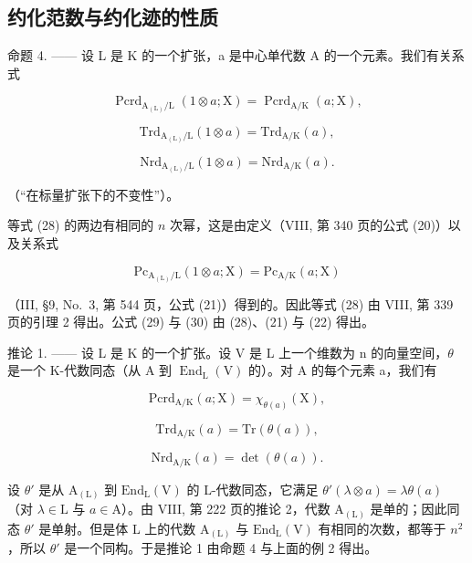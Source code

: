 \subsection{约化范数与约化迹的性质}

命题 4. —— 设 L 是 K 的一个扩张，a 是中心单代数 A 的一个元素。我们有关系式

\[
\operatorname{Pcrd} _ {\mathrm{A} _ {(\mathrm{L})} / \mathrm{L}} (1 \otimes a; \mathrm{X}) = \operatorname{Pcrd} _ {\mathrm{A} / \mathrm{K}} (a; \mathrm{X}),\tag{28}
\]

\[
\mathrm{Trd} _ {\mathrm{A} _ {(\mathrm{L})} / \mathrm{L}} (1 \otimes a) = \mathrm{Trd} _ {\mathrm{A} / \mathrm{K}} (a),\tag{29}
\]

\[
\mathrm{Nrd} _ {\mathrm{A} _ {(\mathrm{L})} / \mathrm{L}} (1 \otimes a) = \mathrm{Nrd} _ {\mathrm{A} / \mathrm{K}} (a).\tag{30}
\]

（``在标量扩张下的不变性''）。

等式 (28) 的两边有相同的 \(n\) 次幂，这是由定义（VIII, 第 340 页的公式 (20)）以及关系式

\[
\mathrm{Pc} _ {\mathrm{A} _ {(\mathrm{L})} / \mathrm{L}} (1 \otimes a; \mathrm{X}) = \mathrm{Pc} _ {\mathrm{A} / \mathrm{K}} (a; \mathrm{X})
\]

（III, §9, No.~3, 第 544 页，公式 (21)）得到的。因此等式 (28) 由 VIII, 第 339 页的引理 2 得出。公式 (29) 与 (30) 由 (28)、(21) 与 (22) 得出。

推论 1. —— 设 L 是 K 的一个扩张。设 V 是 L 上一个维数为 n 的向量空间，\(\theta\) 是一个 K-代数同态（从 A 到 \(\operatorname{End}_{\mathrm{L}}(\mathrm{V})\) 的）。对 A 的每个元素 a，我们有

\[
\mathrm{Pcrd} _ {\mathrm{A/K}} (a; \mathrm{X}) = \chi_ {\theta (a)} (\mathrm{X}),\tag{31}
\]

\[
\mathrm{Trd} _ {\mathrm{A/K}} (a) = \mathrm{Tr} (\theta (a)),\tag{32}
\]

\[
\mathrm{Nrd} _ {\mathrm{A/K}} (a) = \det (\theta (a)).\tag{33}
\]

设 \(\theta'\) 是从 \(\mathrm{A}_{(\mathrm{L})}\) 到 \(\mathrm{End}_{\mathrm{L}}(\mathrm{V})\) 的 L-代数同态，它满足 \(\theta'(\lambda \otimes a) = \lambda \theta(a)\)（对 \(\lambda \in \mathrm{L}\) 与 \(a \in \mathrm{A}\)）。由 VIII, 第 222 页的推论 2，代数 \(\mathrm{A}_{(\mathrm{L})}\) 是单的；因此同态 \(\theta'\) 是单射。但是体 L 上的代数 \(\mathrm{A}_{(\mathrm{L})}\) 与 \(\mathrm{End}_{\mathrm{L}}(\mathrm{V})\) 有相同的次数，都等于 \(n^2\)，所以 \(\theta'\) 是一个同构。于是推论 1 由命题 4 与上面的例 2 得出。

